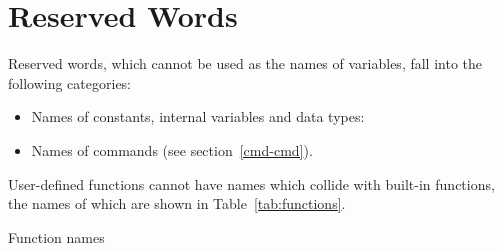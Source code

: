 \chapter{Reserved Words}
\label{reswords}

Reserved words, which cannot be used as the names of variables, fall
into the following categories:

\begin{itemize}
\item Names of constants, internal variables and data types:
  
  
\item Names of  commands (see section~\ref{cmd-cmd}).
\end{itemize}

User-defined functions cannot have names which collide with built-in
functions, the names of which are shown in Table~\ref{tab:functions}.

\begin{table}[htbp]
\caption{Function names}
\label{tab:functions}
\begin{center}

\end{center}
\end{table}

